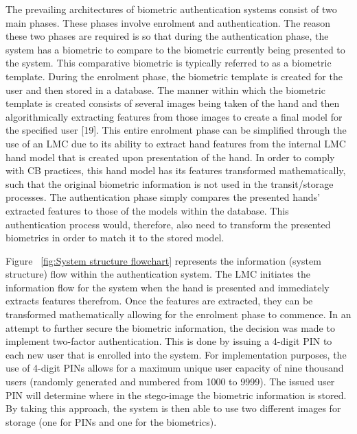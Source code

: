 The prevailing architectures of biometric authentication systems consist of two main phases. These phases involve enrolment and authentication. The reason these two phases are required is so that during the authentication phase, the system has a biometric to compare to the biometric currently being presented to the system. This comparative biometric is typically referred to as a biometric template. During the enrolment phase, the biometric template is created for the user and then stored in a database. The manner within which the biometric template is created consists of several images being taken of the hand and then algorithmically extracting features from those images to create a final model for the specified user [19]. This entire enrolment phase can be simplified through the use of an LMC due to its ability to extract hand features from the internal LMC hand model that is created upon presentation of the hand. In order to comply with CB practices, this hand model has its features transformed mathematically, such that the original biometric information is not used in the transit/storage processes. The authentication phase simply compares the presented hands’ extracted features to those of the models within the database. This authentication process would, therefore, also need to transform the presented biometrics in order to match it to the stored model.

Figure ~\ref{fig:System structure flowchart} represents the information (system structure) flow within the authentication system. The LMC initiates the information flow for the system when the hand is presented and immediately extracts features therefrom. Once the features are extracted, they can be transformed mathematically allowing for the enrolment phase to commence. In an attempt to further secure the biometric information, the decision was made to implement two-factor authentication. This is done by issuing a 4-digit PIN to each new user that is enrolled into the system. For implementation purposes, the use of 4-digit PINs allows for a maximum unique user capacity of nine thousand users (randomly generated and numbered from 1000 to 9999). The issued user PIN will determine where in the stego-image the biometric information is stored. By taking this approach, the system is then able to use two different images for storage (one for PINs and one for the biometrics). 

    
